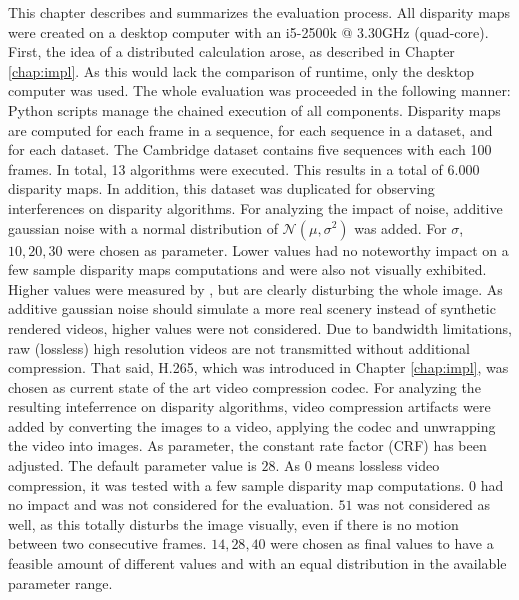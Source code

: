 This chapter describes and summarizes the evaluation process.
All disparity maps were created on a desktop computer with an i5-2500k @ 3.30GHz (quad-core).
First, the idea of a distributed calculation arose, as described in Chapter \ref{chap:impl}.
As this would lack the comparison of runtime, only the desktop computer was used.
\newline\newline\noindent The whole evaluation was proceeded in the following manner:
Python scripts manage the chained execution of all components.
Disparity maps are computed for each frame in a sequence, for each sequence in a dataset, and for each dataset.
The Cambridge dataset contains five sequences with each 100 frames.
In total, 13 algorithms were executed.
This results in a total of $6.000$ disparity maps.
\newline\newline\noindent In addition, this dataset was duplicated for observing interferences on disparity algorithms.
For analyzing the impact of noise, additive gaussian noise with a normal distribution of $\mathcal{N}(\mu,\sigma^2)$ was added.
For $\sigma$, $10, 20, 30$ were chosen as parameter.
Lower values had no noteworthy impact on a few sample disparity maps computations and were also not visually exhibited.
Higher values were measured by \citeauthor{richardt2010real} \citep{richardt2010real}, but are clearly disturbing the whole image.
As additive gaussian noise should simulate a more real scenery instead of synthetic rendered videos, higher values were not considered.
\newline\newline\noindent Due to bandwidth limitations, raw (lossless) high resolution videos are not transmitted without additional compression.
That said, H.265, which was introduced in Chapter \ref{chap:impl}, was chosen as current state of the art video compression codec.
For analyzing the resulting inteferrence on disparity algorithms, video compression artifacts were added by converting the images to a video, applying the codec and unwrapping the video into images.
As parameter, the constant rate factor (CRF) has been adjusted.
The default parameter value is $28$.
As $0$ means lossless video compression, it was tested with a few sample disparity map computations.
$0$ had no impact and was not considered for the evaluation.
$51$ was not considered as well, as this totally disturbs the image visually, even if there is no motion between two consecutive frames.
$14, 28, 40$ were chosen as final values to have a feasible amount of different values and with an equal distribution in the available parameter range.

